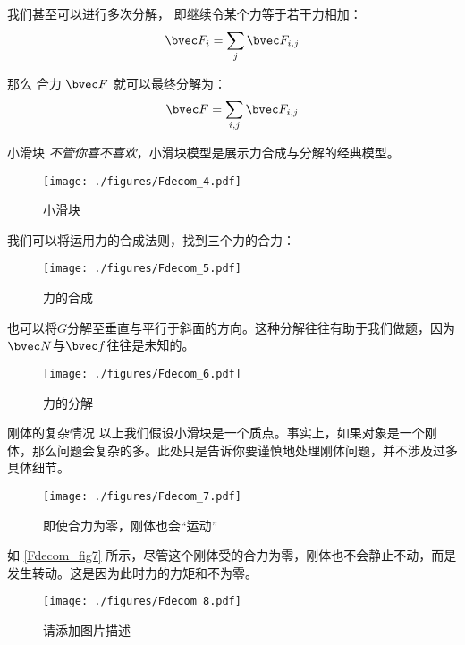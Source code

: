 我们甚至可以进行多次分解， 即继续令某个力等于若干力相加：
\begin{equation}
\bvec F_i = \sum_j \bvec F_{i,j}
\end{equation}

那么 合力 $\bvec F$ 就可以最终分解为：
\begin{equation}
\bvec F = \sum_{i,j} \bvec F_{i,j}
\end{equation}


\begin{example}{小滑块}
\textsl{不管你喜不喜欢}，小滑块模型是展示力合成与分解的经典模型。
\begin{figure}[ht]
\centering
\texttt{[image: ./figures/Fdecom\_4.pdf]}
\caption{小滑块} \label{Fdecom_fig4}
\end{figure}

我们可以将运用力的合成法则，找到三个力的合力：
\begin{figure}[ht]
\centering
\texttt{[image: ./figures/Fdecom\_5.pdf]}
\caption{力的合成} \label{Fdecom_fig5}
\end{figure}

也可以将$G$分解至垂直与平行于斜面的方向。这种分解往往有助于我们做题，因为$\bvec N$与$\bvec f$往往是未知的。
\begin{figure}[ht]
\centering
\texttt{[image: ./figures/Fdecom\_6.pdf]}
\caption{力的分解} \label{Fdecom_fig6}
\end{figure}

\end{example}

\begin{example}{刚体的复杂情况}
以上我们假设小滑块是一个质点。事实上，如果对象是一个刚体，那么问题会复杂的多。此处只是告诉你要谨慎地处理刚体问题，并不涉及过多具体细节。

\begin{figure}[ht]
\centering
\texttt{[image: ./figures/Fdecom\_7.pdf]}
\caption{即使合力为零，刚体也会“运动”} \label{Fdecom_fig7}
\end{figure}
如 \autoref{Fdecom_fig7} 所示，尽管这个刚体受的合力为零，刚体也不会静止不动，而是发生转动。这是因为此时力的力矩和不为零。

\begin{figure}[ht]
\centering
\texttt{[image: ./figures/Fdecom\_8.pdf]}
\caption{请添加图片描述} \label{Fdecom_fig8}
\end{figure}
\end{example}